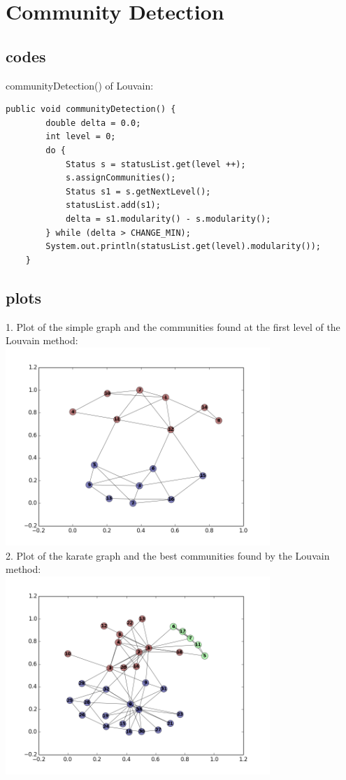 \documentclass[11pt]{article} %
\begin{document}
\section{Community Detection}
\subsection{codes}
communityDetection() of Louvain:
\begin{lstlisting}
public void communityDetection() {
    	double delta = 0.0;
    	int level = 0;
    	do {
    		Status s = statusList.get(level ++);
    		s.assignCommunities();
    		Status s1 = s.getNextLevel();
    		statusList.add(s1);
    		delta = s1.modularity() - s.modularity();
    	} while (delta > CHANGE_MIN);
    	System.out.println(statusList.get(level).modularity());
    }
\end{lstlisting}

\subsection{plots}
1. Plot of the simple graph and the communities found at the first level of the Louvain method:\\
\includegraphics[width=10cm]{simple-gra}\\

2. Plot of the karate graph and the best communities found by the Louvain method:\\
\includegraphics[width=10cm]{karate-gra}\\
\end{document}
